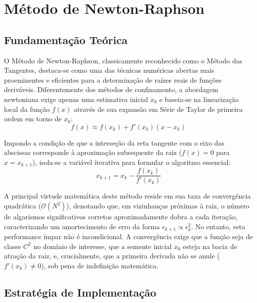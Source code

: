 \section{Método de Newton-Raphson}
\label{sec:metodo_newton_raphson}

\subsection{Fundamentação Teórica}
\label{subsec:fundamentacao_teorica_newton_raphson}

O Método de Newton-Raphson, classicamente reconhecido como o Método das Tangentes, destaca-se como uma das técnicas numéricas abertas mais proeminentes e eficientes para a determinação de raízes reais de funções deriváveis. Diferentemente dos métodos de confinamento, a abordagem newtoniana exige apenas uma estimativa inicial $x_0$ e baseia-se na linearização local da função $f(x)$ através de sua expansão em Série de Taylor de primeira ordem em torno de $x_k$:
\begin{equation}
    f(x) \approx f(x_k) + f'(x_k)(x - x_k)
\end{equation}

Impondo a condição de que a interseção da reta tangente com o eixo das abscissas corresponde à aproximação subsequente da raiz ($f(x) = 0$ para $x = x_{k+1}$), isola-se a variável iterativa para formular o algoritmo essencial:
\begin{equation}
    x_{k+1} = x_k - \frac{f(x_k)}{f'(x_k)}
    \label{eq:formulacao_newton_raphson}
\end{equation}

A principal virtude matemática deste método reside em sua taxa de convergência quadrática ($\mathcal{O}(N^2)$), denotando que, em vizinhanças próximas à raiz, o número de algarismos significativos corretos aproximadamente dobra a cada iteração, caracterizando um amortecimento de erro da forma $\epsilon_{k+1} \propto \epsilon_k^2$. No entanto, esta performance ímpar não é incondicional. A convergência exige que a função seja de classe $C^2$ no domínio de interesse, que a semente inicial $x_0$ esteja na bacia de atração da raiz, e, crucialmente, que a primeira derivada não se anule ($f'(x_k) \neq 0$), sob pena de indefinição matemática.

\subsection{Estratégia de Implementação}
\label{subsec:estrategia_implementacao_newton_raphson}


